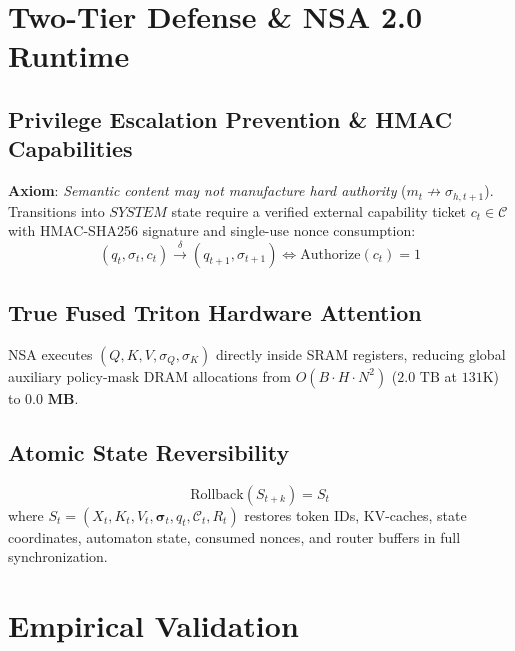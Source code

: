 \documentclass[10pt,twocolumn,letterpaper]{article}
\begin{document}
\section{Two-Tier Defense \& NSA 2.0 Runtime}

\subsection{Privilege Escalation Prevention \& HMAC Capabilities}
\textbf{Axiom}: \textit{Semantic content may not manufacture hard authority} ($m_t \not\to \sigma_{h, t+1}$). Transitions into $SYSTEM$ state require a verified external capability ticket $c_t \in \mathcal{C}$ with HMAC-SHA256 signature and single-use nonce consumption:
\begin{equation}
(q_t, \sigma_t, c_t) \xrightarrow{\delta} (q_{t+1}, \sigma_{t+1}) \iff \text{Authorize}(c_t) = 1
\end{equation}

\subsection{True Fused Triton Hardware Attention}
NSA executes $(Q, K, V, \sigma_Q, \sigma_K)$ directly inside SRAM registers, reducing global auxiliary policy-mask DRAM allocations from $O(B \cdot H \cdot N^2)$ ($2.0\text{ TB}$ at $131\text{K}$) to $\mathbf{0.0\text{ MB}}$.

\subsection{Atomic State Reversibility}
\begin{equation}
\text{Rollback}(S_{t+k}) = S_t
\end{equation}
where $S_t = (X_t, K_t, V_t, \boldsymbol{\sigma}_t, q_t, \mathcal{C}_t, R_t)$ restores token IDs, KV-caches, state coordinates, automaton state, consumed nonces, and router buffers in full synchronization.

\section{Empirical Validation}
\end{document}

